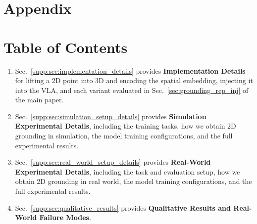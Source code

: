 \clearpage
\appendix
\section*{Appendix}
\section{Table of Contents}
\begin{enumerate}
    \item Sec.~\ref{supp:sec:implementation_details} provides \textbf{Implementation Details} for lifting a 2D point into 3D and encoding the spatial embedding, injecting it into the VLA, and each variant evaluated in Sec.~\ref{sec:grounding_rep_inj} of the main paper.
    \item Sec.~\ref{supp:sec:simulation_setup_details} provides \textbf{Simulation Experimental Details}, including the training tasks, how we obtain 2D grounding in simulation, the model training configurations, and the full experimental results.
    \item Sec.~\ref{supp:sec:real_world_setup_details} provides \textbf{Real-World Experimental Details}, including the task and evaluation setup, how we obtain 2D grounding in real world, the model training configurations, and the full experimental results.
    \item Sec.~\ref{supp:sec:qualitative_results} provides \textbf{Qualitative Results and Real-World Failure Modes}.
    
\end{enumerate}




